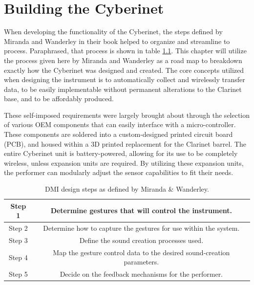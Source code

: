 \chapter{Building the Cyberinet}
When developing the functionality of the Cyberinet, the steps defined by Miranda and Wanderley in their book\cite{miranda_Wanderley_instrumentControl_2006} helped to organize and streamline to process. Paraphrased, that process is shown in table \ref{fig:DMIProcess}. This chapter will utilize the process given here by Miranda and Wanderley as a road map to breakdown exactly how the Cyberinet was designed and created. The core concepts utilized when designing the instrument is to automatically collect and wirelessly transfer data, to be easily implementable without permanent alterations to the Clarinet base, and to be affordably produced.

These self-imposed requirements were largely brought about through the selection of various OEM components that can easily interface with a micro-controller. These components are soldered into a custom-designed printed circuit board (PCB), and housed within a 3D printed replacement for the Clarinet barrel. The entire Cyberinet unit is battery-powered, allowing for its use to be completely wireless, unless expansion units are required. By utilizing these expansion units, the performer can modularly adjust the sensor capabilities to fit their needs.

\begin{table}[]
    \centering
    \begin{tabular}{|c||c|}
    \hline
     Step 1    & Determine gestures that will control the instrument. \\
     \hline
     Step 2    & Determine how to capture the gestures for use within the system. \\
     \hline
     Step 3    & Define the sound creation processes used. \\\hline
     Step 4    &  Map the gesture control data to the desired sound-creation parameters.  \\
     \hline
     Step 5    &  Decide on the feedback mechanisms for the performer.\\
     \hline
    \end{tabular}
    \caption{DMI design steps as defined by Miranda \& Wanderley\cite{miranda_Wanderley_instrumentControl_2006}.}
    \label{fig:DMIProcess}
\end{table}

\newpage

